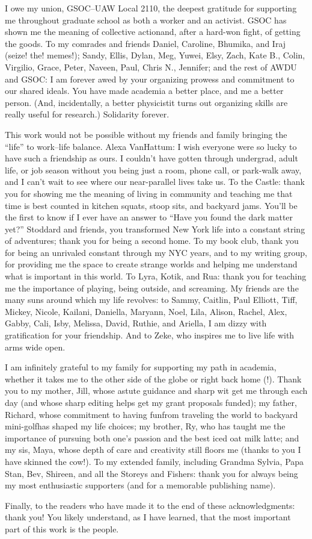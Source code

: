 I owe my union, GSOC--UAW Local 2110, the deepest gratitude for supporting me throughout graduate school as both a worker and an activist. 
GSOC has shown me the meaning of collective action{\emdash}and, after a hard-won fight, of getting the goods.
To my comrades and friends Daniel, Caroline, Bhumika, and Iraj (seize! the! memes!); Sandy, Ellis, Dylan, Meg, Yuwei, Elsy, Zach, Kate B., Colin, Virgilio, Grace, Peter, Naveen, Paul, Chris N., Jennifer; and the rest of AWDU and GSOC: I am forever awed by your organizing prowess and commitment to our shared ideals.
You have made academia a better place, and me a better person. 
(And, incidentally, a better physicist{\emdash}it turns out organizing skills are really useful for research.)
Solidarity forever.

This work would not be possible without my friends and family bringing the ``life'' to work--life balance.
Alexa VanHattum: I wish everyone were so lucky to have such a friendship as ours.
I couldn't have gotten through undergrad, adult life, or job season without you being just a room, phone call, or park-walk away, and I can't wait to see where our near-parallel lives take us.
To the Castle: thank you for showing me the meaning of living in community and teaching me that time is best counted in kitchen squats, stoop sits, and backyard jams.
You'll be the first to know if I ever have an answer to ``Have you found the dark matter yet?''
Stoddard and friends, you transformed New York life into a constant string of adventures; thank you for being a second home.
To my book club, thank you for being an unrivaled constant through my NYC years, and to my writing group, for providing me the space to create strange worlds and helping me understand what is important in this world.
To Lyra, Kotik, and Rua: thank you for teaching me the importance of playing, being outside, and screaming.
My friends are the many suns around which my life revolves: to Sammy, Caitlin, Paul Elliott, Tiff, Mickey, Nicole, Kailani, Daniella, Maryann, Noel, Lila, Alison, Rachel, Alex, Gabby, Cali, Isby, Melissa, David, Ruthie, and Ariella, I am dizzy with gratification for your friendship.
And to Zeke, who inspires me to live life with arms wide open.

I am infinitely grateful to my family for supporting my path in academia, whether it takes me to the other side of the globe or right back home (!).
Thank you to my mother, Jill, whose astute guidance and sharp wit get me through each day (and whose sharp editing helps get my grant proposals funded); my father, Richard, whose commitment to having fun{\emdash}from traveling the world to backyard mini-golf{\emdash}has shaped my life choices; my brother, Ry, who has taught me the importance of pursuing both one's passion and the best iced oat milk latte; and my sis, Maya, whose depth of care and creativity still floors me (thanks to you I have skinned the cow!).
To my extended family, including Grandma Sylvia, Papa Stan, Bev, Shireen, and all the Storeys and Fishers: thank you for always being my most enthusiastic supporters (and for a memorable publishing name).

Finally, to the readers who have made it to the end of these acknowledgments: thank you!
You likely understand, as I have learned, that the most important part of this work is the people.